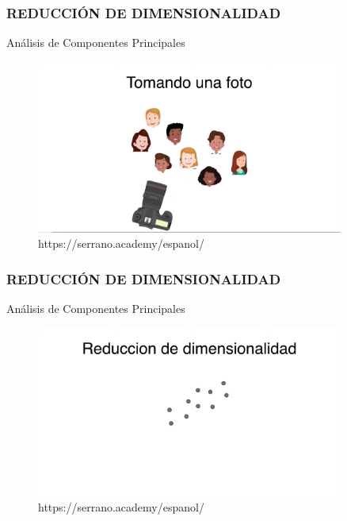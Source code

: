 \documentclass{beamer}
\begin{document}
\begin{frame}
\frametitle{REDUCCIÓN DE DIMENSIONALIDAD}
\begin{block}{Análisis de Componentes Principales}	
	\begin{figure}
		\includegraphics[width=0.9\textwidth]{PCA/IMG_3529.jpg}
		\caption{https://serrano.academy/espanol/}
	\end{figure}
\end{block}
\end{frame}

\begin{frame}
\frametitle{REDUCCIÓN DE DIMENSIONALIDAD}
\begin{block}{Análisis de Componentes Principales}	
	\begin{figure}
		\includegraphics[width=0.9\textwidth]{PCA/IMG_3530.jpg}
		\caption{https://serrano.academy/espanol/}
	\end{figure}
\end{block}
\end{frame}
\end{document}
